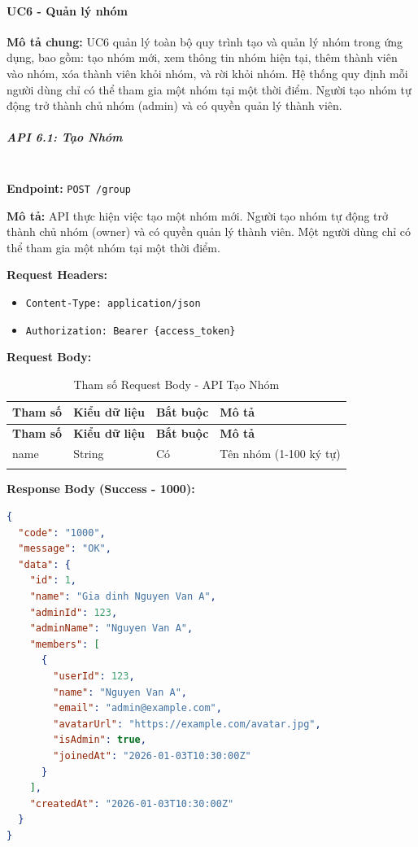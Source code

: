 \paragraph{UC6 - Quản lý nhóm}

\textbf{Mô tả chung:} UC6 quản lý toàn bộ quy trình tạo và quản lý nhóm trong ứng dụng, bao gồm: tạo nhóm mới, xem thông tin nhóm hiện tại, thêm thành viên vào nhóm, xóa thành viên khỏi nhóm, và rời khỏi nhóm. Hệ thống quy định mỗi người dùng chỉ có thể tham gia một nhóm tại một thời điểm. Người tạo nhóm tự động trở thành chủ nhóm (admin) và có quyền quản lý thành viên.

\subparagraph{API 6.1: Tạo Nhóm}~\\

\textbf{Endpoint:} \texttt{POST /group}

\textbf{Mô tả:} API thực hiện việc tạo một nhóm mới. Người tạo nhóm tự động trở thành chủ nhóm (owner) và có quyền quản lý thành viên. Một người dùng chỉ có thể tham gia một nhóm tại một thời điểm.

\textbf{Request Headers:}
\begin{itemize}
    \item \texttt{Content-Type: application/json}
    \item \texttt{Authorization: Bearer \{access\_token\}}
\end{itemize}

\textbf{Request Body:}

\small
\begin{longtable}{|>{\raggedright\arraybackslash}p{3.5cm}|>{\raggedright\arraybackslash}p{2.5cm}|>{\raggedright\arraybackslash}p{2cm}|>{\raggedright\arraybackslash}p{5.5cm}|}
\hline
\textbf{Tham số} & \textbf{Kiểu dữ liệu} & \textbf{Bắt buộc} & \textbf{Mô tả} \\
\hline
\endfirsthead
\hline
\textbf{Tham số} & \textbf{Kiểu dữ liệu} & \textbf{Bắt buộc} & \textbf{Mô tả} \\
\hline
\endhead
name & String & Có & Tên nhóm (1-100 ký tự) \\
\hline
\caption{Tham số Request Body - API Tạo Nhóm}
\end{longtable}

\textbf{Response Body (Success - 1000):}

\begin{lstlisting}[language=json, caption=Response thanh cong API 6.1]
{
  "code": "1000",
  "message": "OK",
  "data": {
    "id": 1,
    "name": "Gia dinh Nguyen Van A",
    "adminId": 123,
    "adminName": "Nguyen Van A",
    "members": [
      {
        "userId": 123,
        "name": "Nguyen Van A",
        "email": "admin@example.com",
        "avatarUrl": "https://example.com/avatar.jpg",
        "isAdmin": true,
        "joinedAt": "2026-01-03T10:30:00Z"
      }
    ],
    "createdAt": "2026-01-03T10:30:00Z"
  }
}
\end{lstlisting}

